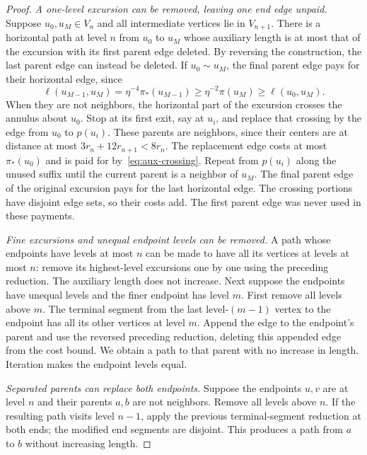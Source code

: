 \documentclass[11pt,reqno]{amsart}
\theoremstyle{plain}
\theoremstyle{definition}
\theoremstyle{remark}
\newcommand{\1}{\mathbf{1}}
\begin{document}
\begin{proof}
\emph{A one-level excursion can be removed, leaving one end edge unpaid.} Suppose $u_0,u_M\in V_n$ and all intermediate vertices lie in $V_{n+1}$. There is a horizontal path at level $n$ from $u_0$ to $u_M$ whose auxiliary length is at most that of the excursion with its first parent edge deleted. By reversing the construction, the last parent edge can instead be deleted. If $u_0\sim u_M$, the final parent edge pays for their horizontal edge, since
\begin{equation*}
\ell(u_{M-1},u_M)=\eta^{-4}\pi_*(u_{M-1})
\ge\eta^{-2}\pi(u_M)\ge\ell(u_0,u_M).
\end{equation*}
When they are not neighbors, the horizontal part of the excursion crosses the annulus about $u_0$. Stop at its first exit, say at $u_i$, and replace that crossing by the edge from $u_0$ to $p(u_i)$. These parents are neighbors, since their centers are at distance at most $3r_n+12r_{n+1}<8r_n$. The replacement edge costs at most $\pi_*(u_0)$ and is paid for by~\eqref{eq:aux-crossing}. Repeat from $p(u_i)$ along the unused suffix until the current parent is a neighbor of $u_M$. The final parent edge of the original excursion pays for the last horizontal edge. The crossing portions have disjoint edge sets, so their costs add. The first parent edge was never used in these payments.

\emph{Fine excursions and unequal endpoint levels can be removed.} A path whose endpoints have levels at most $n$ can be made to have all its vertices at levels at most $n$: remove its highest-level excursions one by one using the preceding reduction. The auxiliary length does not increase. Next suppose the endpoints have unequal levels and the finer endpoint has level $m$. First remove all levels above $m$. The terminal segment from the last level-$(m-1)$ vertex to the endpoint has all its other vertices at level $m$. Append the edge to the endpoint's parent and use the reversed preceding reduction, deleting this appended edge from the cost bound. We obtain a path to that parent with no increase in length. Iteration makes the endpoint levels equal.

\emph{Separated parents can replace both endpoints.} Suppose the endpoints $u,v$ are at level $n$ and their parents $a,b$ are not neighbors. Remove all levels above $n$. If the resulting path visits level $n-1$, apply the previous terminal-segment reduction at both ends; the modified end segments are disjoint. This produces a path from $a$ to $b$ without increasing length.


\end{proof}
\end{document}
